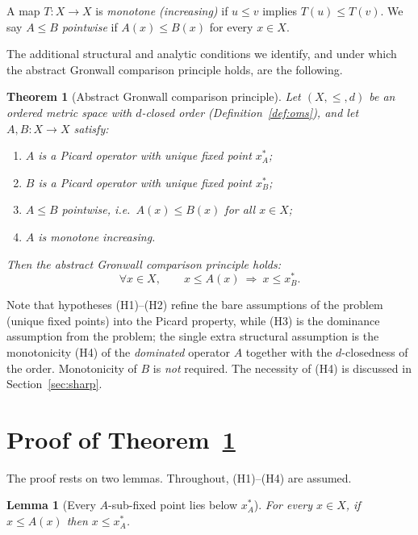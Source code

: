 \documentclass{amsart}
\theoremstyle{plain}
\newtheorem{theorem}{Theorem}
\newtheorem{lemma}{Lemma}
\theoremstyle{definition}
\newcommand{\xA}{x^{*}_{A}}
\newcommand{\xB}{x^{*}_{B}}
\begin{document}
A map $T:X\to X$ is \emph{monotone (increasing)} if $u\le v$ implies
$T(u)\le T(v)$. We say $A\le B$ \emph{pointwise} if $A(x)\le B(x)$ for every
$x\in X$.

\medskip

The additional structural and analytic conditions we identify, and under which
the abstract Gronwall comparison principle holds, are the following.

\begin{theorem}[Abstract Gronwall comparison principle]\label{thm:main}
Let $(X,\le,d)$ be an ordered metric space with $d$-closed order
\textup{(Definition~\ref{def:oms})}, and let $A,B:X\to X$ satisfy:
\begin{enumerate}
\item[\textup{(H1)}] $A$ is a Picard operator with unique fixed point $\xA$;
\item[\textup{(H2)}] $B$ is a Picard operator with unique fixed point $\xB$;
\item[\textup{(H3)}] $A\le B$ pointwise, i.e.\ $A(x)\le B(x)$ for all $x\in X$;
\item[\textup{(H4)}] $A$ is monotone increasing.
\end{enumerate}
Then the abstract Gronwall comparison principle holds:
\[
   \forall x\in X,\qquad x\le A(x)\ \Longrightarrow\ x\le \xB .
\]
\end{theorem}

Note that hypotheses (H1)--(H2) refine the bare assumptions of the problem
(unique fixed points) into the Picard property, while (H3) is the dominance
assumption from the problem; the single extra structural assumption is the
monotonicity (H4) of the \emph{dominated} operator $A$ together with the
$d$-closedness of the order. Monotonicity of $B$ is \emph{not} required. The
necessity of (H4) is discussed in Section~\ref{sec:sharp}.

\section{Proof of Theorem~\ref{thm:main}}

The proof rests on two lemmas. Throughout, (H1)--(H4) are assumed.

\begin{lemma}[Every $A$-sub-fixed point lies below $\xA$]\label{lem:sub}
For every $x\in X$, if $x\le A(x)$ then $x\le \xA$.
\end{lemma}
\end{document}
